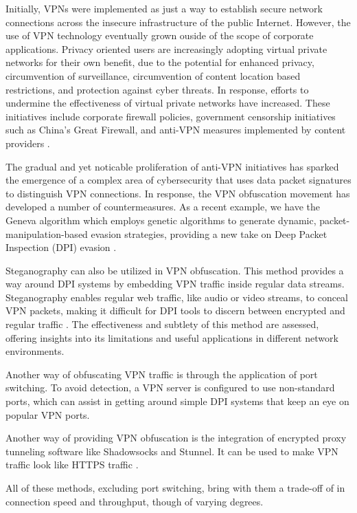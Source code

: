 \documentclass[12pt, fleqn, a4paper]{article}
\begin{document}
Initially, VPNs were implemented as just a way to establish secure network connections across the insecure infrastructure of the public Internet. However, the use of VPN technology eventually grown ouside of the scope of corporate applications. Privacy oriented users are increasingly adopting virtual private networks for their own benefit, due to the potential for enhanced privacy, circumvention of surveillance, circumvention of content location based restrictions, and protection against cyber threats. In response, efforts to undermine the effectiveness of virtual private networks have increased. These initiatives include corporate firewall policies, government censorship initiatives such as China's Great Firewall, and anti-VPN measures implemented by content providers \citep{DPL}.

The gradual and yet noticable proliferation of anti-VPN initiatives has sparked the emergence of a complex area of cybersecurity that uses data packet signatures to distinguish VPN connections. In response, the VPN obfuscation movement has developed a number of countermeasures. As a recent example, we have the Geneva algorithm which employs genetic algorithms to generate dynamic, packet-
manipulation-based evasion strategies, providing a new take on Deep Packet Inspection (DPI) evasion \citep{Geneva}.

Steganography can also be utilized in VPN obfuscation. This method provides a way around DPI systems by embedding VPN traffic inside regular data streams. Steganography enables regular web traffic, like audio or video streams, to conceal VPN packets, making it difficult for DPI tools to discern between encrypted and regular traffic \citep{Stega}. The effectiveness and subtlety of this method are assessed, offering insights into its limitations and useful applications in different network environments.

Another way of obfuscating VPN traffic is through the application of port switching. To avoid detection, a VPN server is configured to use non-standard ports, which can assist in getting around simple DPI systems that keep an eye on popular VPN ports. 

Another way of providing VPN obfuscation is the integration of encrypted proxy tunneling software like Shadowsocks and Stunnel. It can be used to make VPN traffic look like HTTPS traffic \citep{Shadowsocks}. 

All of these methods, excluding port switching, bring with them a trade-off of in connection speed and throughput, 
though of varying degrees.
\end{document}
